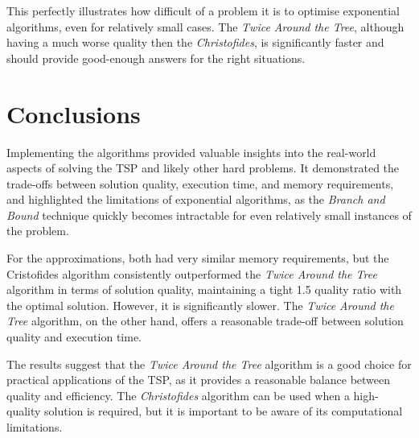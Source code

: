 \documentclass[12pt]{article}
\begin{document}
This perfectly illustrates how difficult of a problem it is to optimise exponential algorithms, even for relatively 
small cases. The \textit{Twice Around the Tree}, although having a much worse quality then the \textit{Christofides}, is 
significantly faster and should provide good-enough answers for the right situations.

\section{Conclusions} \label{sec:conclusions}

Implementing the algorithms provided valuable insights into the real-world aspects of solving the TSP and likely other hard problems. 
It demonstrated the trade-offs between solution quality, execution time, and memory requirements, 
and highlighted the limitations of exponential algorithms, as the \textit{Branch and Bound} technique quickly becomes intractable for even relatively small instances of the problem.

For the approximations, both had very similar memory requirements, but the Cristofides algorithm consistently outperformed the \textit{Twice Around the Tree} 
algorithm in terms of solution quality, maintaining a tight 1.5 quality ratio with the optimal 
solution. However, it is significantly slower. The \textit{Twice Around the Tree} algorithm, on the other hand, 
offers a reasonable trade-off between solution quality and execution time.

The results suggest that the \textit{Twice Around the Tree} algorithm is a good choice for practical applications of the 
TSP, as it provides a reasonable balance between quality and efficiency. The \textit{Christofides} algorithm can be used 
when a high-quality solution is required, but it is important to be aware of its computational limitations.



\end{document}
